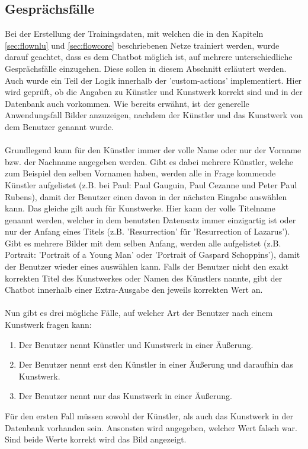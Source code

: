 \subsection{Gesprächsfälle}\label{sec:dialog}
Bei der Erstellung der Trainingsdaten, mit welchen die in den Kapiteln \ref{sec:flownlu} und \ref{sec:flowcore} beschriebenen Netze trainiert werden, wurde darauf geachtet, dass es dem Chatbot möglich ist, auf mehrere unterschiedliche Gesprächsfälle einzugehen. Diese sollen in diesem Abschnitt erläutert werden. Auch wurde ein Teil der Logik innerhalb der 'custom-actions' implementiert. Hier wird geprüft, ob die Angaben zu Künstler und Kunstwerk korrekt sind und in der Datenbank auch vorkommen. Wie bereits erwähnt, ist der generelle Anwendungsfall Bilder anzuzeigen, nachdem der Künstler und das Kunstwerk von dem Benutzer genannt wurde.\\
\\
Grundlegend kann für den Künstler immer der volle Name oder nur der Vorname bzw. der Nachname angegeben werden. Gibt es dabei mehrere Künstler, welche zum Beispiel den selben Vornamen haben, werden alle in Frage kommende Künstler aufgelistet (z.B. bei Paul: Paul Gauguin, Paul Cezanne und Peter Paul Rubens), damit der Benutzer einen davon in der nächsten Eingabe auswählen kann. Das gleiche gilt auch für Kunstwerke. Hier kann der volle Titelname genannt werden, welcher in dem benutzten Datensatz immer einzigartig ist oder nur der Anfang eines Titels (z.B. 'Resurrection' für 'Resurrection of Lazarus'). Gibt es mehrere Bilder mit dem selben Anfang, werden alle aufgelistet (z.B. Portrait: 'Portrait of a Young Man' oder 'Portrait of Gaspard Schoppins'), damit der Benutzer wieder eines auswählen kann. Falls der Benutzer nicht den exakt korrekten Titel des Kunstwerkes oder Namen des Künstlers nannte, gibt der Chatbot innerhalb einer Extra-Ausgabe den jeweils korrekten Wert an.\\
\\
Nun gibt es drei mögliche Fälle, auf welcher Art der Benutzer nach einem Kunstwerk fragen kann: 
\begin{enumerate}
	\setlength\itemsep{-0.6em}
	\item Der Benutzer nennt Künstler und Kunstwerk in einer Äußerung.
	\item Der Benutzer nennt erst den Künstler in einer Äußerung und daraufhin das Kunstwerk.
	\item Der Benutzer nennt nur das Kunstwerk in einer Äußerung.
\end{enumerate}
Für den ersten Fall müssen sowohl der Künstler, als auch das Kunstwerk in der Datenbank vorhanden sein. Ansonsten wird angegeben, welcher Wert falsch war. Sind beide Werte korrekt wird das Bild angezeigt.\\
